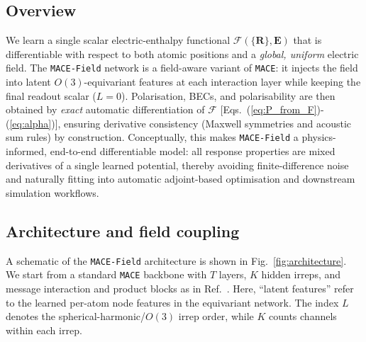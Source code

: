 \documentclass[aps,physrev,graphicx,amsmath,amssymb,
               reprint,superscriptaddress]{revtex4-2}
\begin{document}
\subsection{Overview}
We learn a single scalar electric-enthalpy functional $\mathcal F(\{\mathbf R\},\mathbf E)$ that is differentiable with respect to both atomic positions and a \emph{global, uniform} electric field. The \texttt{MACE-Field} network is a field-aware variant of \texttt{MACE}: it injects the field into latent $O(3)$-equivariant features at each interaction layer while keeping the final readout scalar ($L{=}0$). Polarisation, BECs, and polarisability are then obtained by \emph{exact} automatic differentiation of $\mathcal F$
[Eqs.~(\ref{eq:P_from_F})-(\ref{eq:alpha})], ensuring derivative consistency (Maxwell symmetries and acoustic sum rules) by construction. Conceptually, this makes \texttt{MACE-Field} a physics-informed, end-to-end differentiable model: all response properties are mixed derivatives of a single learned potential, thereby avoiding finite-difference noise and naturally fitting into automatic adjoint-based optimisation and downstream simulation workflows.

\subsection{Architecture and field coupling}

A schematic of the \texttt{MACE-Field} architecture is shown in Fig.~\ref{fig:architecture}. We start from a standard \texttt{MACE} backbone with $T$ layers, $K$ hidden irreps, and message interaction and product blocks as in Ref.~. Here, ``latent features'' refer to the learned per-atom node features in the equivariant network. The index $L$ denotes the spherical-harmonic/$O(3)$ irrep order, while $K$ counts channels within each irrep.
\end{document}
